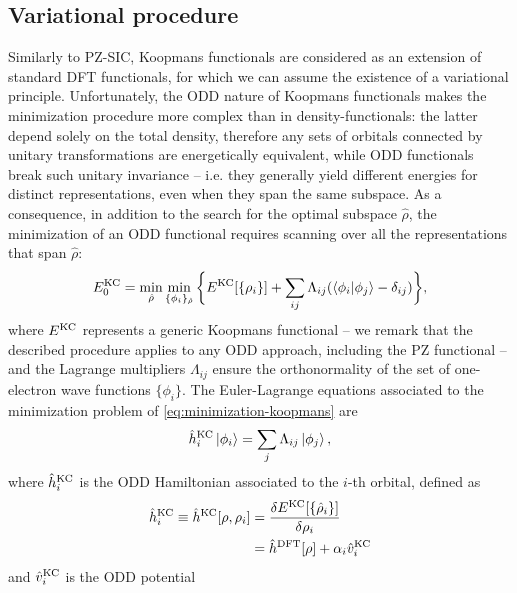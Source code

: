 \subsection{Variational procedure\label{sec:variational-procedure}}
Similarly to PZ-SIC, Koopmans functionals are considered as an extension of standard DFT functionals, for which we can assume the existence of a variational principle. Unfortunately, the ODD nature of Koopmans functionals makes the minimization procedure more complex than in density-functionals: the latter depend solely on the total density, therefore any sets of orbitals connected by unitary transformations are energetically equivalent, while ODD functionals break such unitary invariance -- i.e. they generally yield different energies for distinct representations, even when they span the same subspace. As a consequence, in addition to the search for the optimal subspace $\hat{\rho}$, the minimization of an ODD functional requires scanning over all the representations that span $\hat{\rho}$:
%
\begin{equation}
    E^{\rm KC}_0 = \min_{\hat{\rho}} \min_{\{ \phi_i \}_{\hat{\rho}}} \bigg\{ E^{\rm KC}[\{ \rho_i \}] + \sum_{ij} \Lambda_{ij} (\braket{\phi_i|\phi_j} - \delta_{ij}) \bigg\} ,
    \label{eq:minimization-koopmans}
\end{equation}
%
where $E^{\rm KC}$ represents a generic Koopmans functional -- we remark that the described procedure applies to any ODD approach, including the PZ functional -- and the Lagrange multipliers $\Lambda_{ij}$ ensure the orthonormality of the set of one-electron wave functions $\{ \phi_i \}$. The Euler-Lagrange equations associated to the minimization problem of \cref{eq:minimization-koopmans} are
%
\begin{equation}
    \hat{h}^{\rm KC}_i \ket{\phi_i} = \sum_j \Lambda_{ij} \ket{\phi_j} ,
    \label{eq:euler-lagrange-koopmans}
\end{equation}
%
where $\hat{h}^{\rm KC}_i$ is the ODD Hamiltonian associated to the $i$-th orbital, defined as
%
\begin{equation}
    \begin{split}
        \hat{h}^{\rm KC}_i \equiv \hat{h}^{\rm KC}[\rho,\rho_i] &= \frac{\delta E^{\rm KC}[\{ \hat{\rho}_i \}]}{\delta \rho_i} \\
        &=  \hat{h}^{\rm DFT}[\rho] + \alpha_i \hat{v}^{\rm KC}_i
    \end{split}
    \label{eq:koopmans-functional-derivative}
\end{equation}
%
and $\hat{v}_i^{\rm KC}$ is the ODD potential
